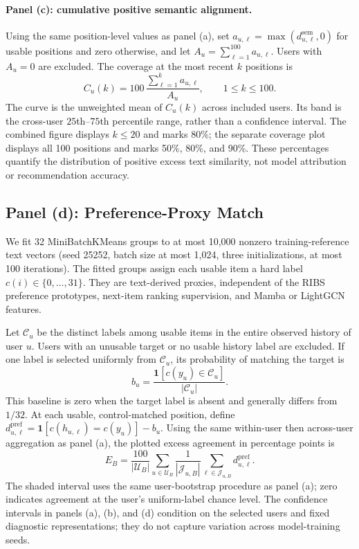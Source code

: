 \documentclass[11pt]{article}
\begin{document}
\paragraph{Panel (c): cumulative positive semantic alignment.}
Using the same position-level values as panel (a), set $a_{u,\ell}=\max(d^{\mathrm{sem}}_{u,\ell},0)$ for usable positions and zero otherwise, and let $A_u=\sum_{\ell=1}^{100}a_{u,\ell}$. Users with $A_u=0$ are excluded. The coverage at the most recent $k$ positions is
\begin{equation}
 C_u(k)=100\,\frac{\sum_{\ell=1}^{k}a_{u,\ell}}{A_u},
 \qquad 1\leq k\leq100.
 \label{eq:prelim_coverage}
\end{equation}
The curve is the unweighted mean of $C_u(k)$ across included users. Its band is the cross-user $25$th--$75$th percentile range, rather than a confidence interval. The combined figure displays $k\leq20$ and marks 80\%; the separate coverage plot displays all 100 positions and marks 50\%, 80\%, and 90\%. These percentages quantify the distribution of positive excess text similarity, not model attribution or recommendation accuracy.

\subsection{Panel (d): Preference-Proxy Match}
\label{app:preliminary_match}
We fit 32 MiniBatchKMeans groups to at most 10,000 nonzero training-reference text vectors (seed 25252, batch size at most 1,024, three initializations, at most 100 iterations). The fitted groups assign each usable item a hard label $c(i)\in\{0,\ldots,31\}$. They are text-derived proxies, independent of the RIBS preference prototypes, next-item ranking supervision, and Mamba or LightGCN features.

Let $\mathcal C_u$ be the distinct labels among usable items in the entire observed history of user $u$. Users with an unusable target or no usable history label are excluded. If one label is selected uniformly from $\mathcal C_u$, its probability of matching the target is
\begin{equation}
 b_u=\frac{\mathbf 1[c(y_u)\in\mathcal C_u]}{|\mathcal C_u|}.
 \label{eq:prelim_preference_baseline}
\end{equation}
This baseline is zero when the target label is absent and generally differs from $1/32$. At each usable, control-matched position, define $d^{\mathrm{pref}}_{u,\ell}=\mathbf 1[c(h_{u,\ell})=c(y_u)]-b_u$. Using the same within-user then across-user aggregation as panel (a), the plotted excess agreement in percentage points is
\begin{equation}
 E_B=\frac{100}{|\mathcal U_B|}
 \sum_{u\in\mathcal U_B}\frac{1}{|\mathcal J_{u,B}|}
 \sum_{\ell\in\mathcal J_{u,B}}d^{\mathrm{pref}}_{u,\ell}.
 \label{eq:prelim_preference_match}
\end{equation}
The shaded interval uses the same user-bootstrap procedure as panel (a); zero indicates agreement at the user's uniform-label chance level. The confidence intervals in panels (a), (b), and (d) condition on the selected users and fixed diagnostic representations; they do not capture variation across model-training seeds.
\end{document}
